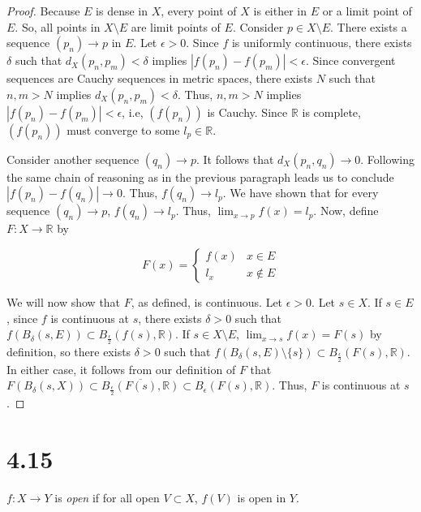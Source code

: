 \documentclass[12pt]{article}
\begin{document}
\begin{proof}
      Because $E$ is dense in $X$, every point of $X$ is either in 
      $E$ or a limit point of $E$. So, all points in $X\setminus E$ are 
      limit points of $E$. Consider $p\in X\setminus E$. There exists a 
      sequence $(p_{n})\to p$ in $E$. Let $\epsilon>0$. Since $f$ is 
      uniformly continuous, there exists $\delta$ such that 
      $d_{X}(p_{n}, p_{m})<\delta$ implies 
      $|f(p_{n})-f(p_{m})|<\epsilon$. Since convergent sequences are 
      Cauchy sequences in metric spaces, there exists $N$ such that 
      $n, m>N$ implies $d_{X}(p_{n}, p_{m})<\delta$. Thus, $n, m>N$ 
      implies $|f(p_{n})-f(p_{m})|<\epsilon$, i.e, $(f(p_{n}))$ is 
      Cauchy. Since $\mathbb{R}$ is complete, $(f(p_{n}))$ must 
      converge to some $l_{p} \in\mathbb{R}$. 

      Consider another sequence $(q_{n})\to p$. It follows that 
      $d_{X}(p_{n}, q_{n})\to 0$. Following the same chain of reasoning 
      as in the previous paragraph leads us to conclude 
      $|f(p_{n})-f(q_{n})|\to 0$. Thus, $f(q_{n})\to l_{p}$. We have 
      shown that for every sequence $(q_{n})\to p$, $f(q_{n})\to l_{p}$. 
      Thus, $\lim_{ x \to p }f(x)=l_{p}$. Now, define 
      $F:X\to \mathbb{R}$ by

      $$
      F(x)=
      \begin{cases}
      f(x) & x\in E \\
      l_{x} & x\not\in E
      \end{cases}
      $$

      We will now show that $F$, as defined, is continuous. 
      Let $\epsilon>0$. Let $s\in X$. If $s\in E$, since $f$ is 
      continuous at $s$, there exists $\delta>0$ such that 
      $f(B_{\delta}(s, E))\subset B_{\frac{\epsilon}{2}}(f(s), 
      \mathbb{R})$. If $s\in X\setminus E$, $\lim_{ x \to s }f(x)=F(s)$ 
      by definition, so there exists $\delta>0$ such that 
      $f(B_{\delta}(s, E)\setminus \{ s \})\subset 
      B_{\frac{\epsilon}{2}}(F(s), \mathbb{R})$. In either case, 
      it follows from our definition of $F$ that 
      $F(B_{\delta}(s, X))\subset \overline{B_{\frac{\epsilon}{2}}(F(s), 
      \mathbb{R})}\subset B_{\epsilon}(F(s), \mathbb{R})$. 
      Thus, $F$ is continuous at $s$.
\end{proof}

\pagebreak

\section{4.15}
$f:X\to Y$ is {\it open} if for all open $V\subset X$, $f(V)$ is open in $Y$. 
\end{document}
